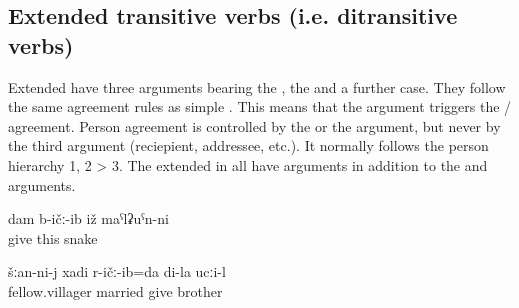 
\subsection{Extended transitive verbs (i.e. ditransitive verbs)}
\label{sec:Extended transitive verbs and ditransitive verbs}

Extended  have three arguments bearing the , the  and a further case. They follow the same agreement rules as simple . This means that the  argument triggers the / agreement. Person agreement is controlled by the  or the  argument, but never by the third argument (reciepient, addressee, etc.). It normally follows the person hierarchy 1, 2 > 3. The extended  in  all have  arguments in addition to the  and  arguments.
%
\begin{exe}
	\ex	\label{ex:extended di-transitive verbs}
	\begin{xlist}
		\ex	{} 
		\ex	{} 
		\ex	{} 
		\ex	{} 
	\end{xlist}

	\ex	\label{ex:The snake gave it to me}
	\gll	dam	b-ičː-ib	iž	maˁlʡuˁn-ni\\
			give	this	snake\\
	\glt	{}

	\ex	\label{ex:My brother married me off to a fellow villager}
	\gll	šːan-ni-j	xadi	r-ičː-ib=da	di-la	ucːi-l\\
		fellow.villager married	give	 brother\\
	\glt	{}
\end{exe}

